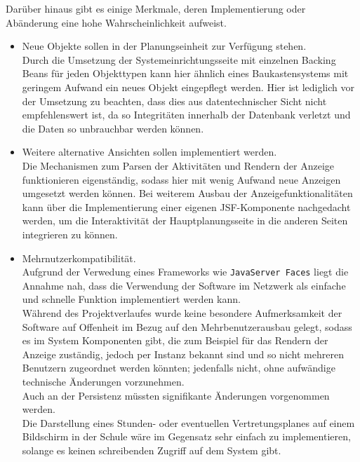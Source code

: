 \documentclass[fontsize=12pt,paper=a4,twoside]{scrartcl}
\begin{document}
Darüber hinaus gibt es einige Merkmale, deren Implementierung oder Abänderung eine hohe Wahrscheinlichkeit aufweist.

\begin{itemize}
\item Neue Objekte sollen in der Planungseinheit zur Verfügung stehen.\\
Durch die Umsetzung der Systemeinrichtungsseite mit einzelnen Backing Beans für jeden Objekttypen kann hier ähnlich eines Baukastensystems mit geringem Aufwand ein neues Objekt eingepflegt werden. Hier ist lediglich vor der Umsetzung zu beachten, dass dies aus datentechnischer Sicht nicht empfehlenswert ist, da so Integritäten innerhalb der Datenbank verletzt und die Daten so unbrauchbar werden können.\\

\item Weitere alternative Ansichten sollen implementiert werden.\\
Die Mechanismen zum Parsen der Aktivitäten und Rendern der Anzeige funktionieren eigenständig, sodass hier mit wenig Aufwand neue Anzeigen umgesetzt werden können. Bei weiterem Ausbau der Anzeigefunktionalitäten kann über die Implementierung einer eigenen JSF-Komponente nachgedacht werden, um die Interaktivität der Hauptplanungsseite in die anderen Seiten integrieren zu können.\\

\item Mehrnutzerkompatibilität.\\
Aufgrund der Verwedung eines Frameworks wie \texttt{JavaServer Faces} liegt die Annahme nah, dass die Verwendung der Software im Netzwerk als einfache und schnelle Funktion implementiert werden kann.\\
Während des Projektverlaufes wurde keine besondere Aufmerksamkeit der Software auf Offenheit im Bezug auf den Mehrbenutzerausbau gelegt, sodass es im System Komponenten gibt, die zum Beispiel für das Rendern der Anzeige zuständig, jedoch per Instanz bekannt sind und so nicht mehreren Benutzern zugeordnet werden könnten; jedenfalls nicht, ohne aufwändige technische Änderungen vorzunehmen.\\
Auch an der Persistenz müssten signifikante Änderungen vorgenommen werden.\\
Die Darstellung eines Stunden- oder eventuellen Vertretungsplanes auf einem Bildschirm in der Schule wäre im Gegensatz sehr einfach zu implementieren, solange es keinen schreibenden Zugriff auf dem System gibt.\\


\end{itemize}
\end{document}
